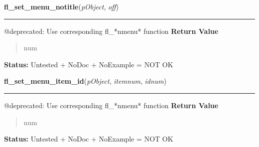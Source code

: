     \label{xformslib:deprecated:fl_set_menu_notitle}

    \vspace{0.5ex}

\hspace{.8\funcindent}\begin{boxedminipage}{\funcwidth}

    \raggedright \textbf{fl\_set\_menu\_notitle}(\textit{pObject}, \textit{off})

    \vspace{-1.5ex}

    \rule{\textwidth}{0.5\fboxrule}
\setlength{\parskip}{2ex}

@deprecated: Use corresponding fl\_*nmenu* function
\setlength{\parskip}{1ex}
      \textbf{Return Value}
    \vspace{-1ex}

      \begin{quote}

num
      \end{quote}

\textbf{Status:} 
Untested + NoDoc + NoExample = NOT OK


    \end{boxedminipage}

    \label{xformslib:deprecated:fl_set_menu_item_id}

    \vspace{0.5ex}

\hspace{.8\funcindent}\begin{boxedminipage}{\funcwidth}

    \raggedright \textbf{fl\_set\_menu\_item\_id}(\textit{pObject}, \textit{itemnum}, \textit{idnum})

    \vspace{-1.5ex}

    \rule{\textwidth}{0.5\fboxrule}
\setlength{\parskip}{2ex}

@deprecated: Use corresponding fl\_*nmenu* function
\setlength{\parskip}{1ex}
      \textbf{Return Value}
    \vspace{-1ex}

      \begin{quote}

num
      \end{quote}

\textbf{Status:} 
Untested + NoDoc + NoExample = NOT OK


    \end{boxedminipage}

